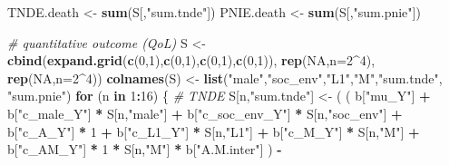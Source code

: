 \documentclass[
]{book}
\newenvironment{Shaded}{\begin{snugshade}}{\end{snugshade}}
\newcommand{\AttributeTok}[1]{\textcolor[rgb]{0.13,0.29,0.53}{#1}}
\newcommand{\CommentTok}[1]{\textcolor[rgb]{0.56,0.35,0.01}{\textit{#1}}}
\newcommand{\ConstantTok}[1]{\textcolor[rgb]{0.56,0.35,0.01}{#1}}
\newcommand{\ControlFlowTok}[1]{\textcolor[rgb]{0.13,0.29,0.53}{\textbf{#1}}}
\newcommand{\DecValTok}[1]{\textcolor[rgb]{0.00,0.00,0.81}{#1}}
\newcommand{\FunctionTok}[1]{\textcolor[rgb]{0.13,0.29,0.53}{\textbf{#1}}}
\newcommand{\NormalTok}[1]{#1}
\newcommand{\OtherTok}[1]{\textcolor[rgb]{0.56,0.35,0.01}{#1}}
\newcommand{\SpecialCharTok}[1]{\textcolor[rgb]{0.81,0.36,0.00}{\textbf{#1}}}
\newcommand{\StringTok}[1]{\textcolor[rgb]{0.31,0.60,0.02}{#1}}
\begin{document}
\begin{Shaded}
\begin{Highlighting}[]
\NormalTok{  TNDE.death }\OtherTok{\textless{}{-}} \FunctionTok{sum}\NormalTok{(S[,}\StringTok{"sum.tnde"}\NormalTok{])}
\NormalTok{  PNIE.death }\OtherTok{\textless{}{-}} \FunctionTok{sum}\NormalTok{(S[,}\StringTok{"sum.pnie"}\NormalTok{])}
  
  \CommentTok{\# quantitative outcome (QoL)}
\NormalTok{  S }\OtherTok{\textless{}{-}} \FunctionTok{cbind}\NormalTok{(}\FunctionTok{expand.grid}\NormalTok{(}\FunctionTok{c}\NormalTok{(}\DecValTok{0}\NormalTok{,}\DecValTok{1}\NormalTok{),}\FunctionTok{c}\NormalTok{(}\DecValTok{0}\NormalTok{,}\DecValTok{1}\NormalTok{),}\FunctionTok{c}\NormalTok{(}\DecValTok{0}\NormalTok{,}\DecValTok{1}\NormalTok{),}\FunctionTok{c}\NormalTok{(}\DecValTok{0}\NormalTok{,}\DecValTok{1}\NormalTok{)), }\FunctionTok{rep}\NormalTok{(}\ConstantTok{NA}\NormalTok{,}\AttributeTok{n=}\DecValTok{2}\SpecialCharTok{\^{}}\DecValTok{4}\NormalTok{), }\FunctionTok{rep}\NormalTok{(}\ConstantTok{NA}\NormalTok{,}\AttributeTok{n=}\DecValTok{2}\SpecialCharTok{\^{}}\DecValTok{4}\NormalTok{))}
  \FunctionTok{colnames}\NormalTok{(S) }\OtherTok{\textless{}{-}} \FunctionTok{list}\NormalTok{(}\StringTok{"male"}\NormalTok{,}\StringTok{"soc\_env"}\NormalTok{,}\StringTok{"L1"}\NormalTok{,}\StringTok{"M"}\NormalTok{,}\StringTok{"sum.tnde"}\NormalTok{, }\StringTok{"sum.pnie"}\NormalTok{)}
  \ControlFlowTok{for}\NormalTok{ (n }\ControlFlowTok{in} \DecValTok{1}\SpecialCharTok{:}\DecValTok{16}\NormalTok{) \{}
    \CommentTok{\# TNDE }
\NormalTok{    S[n,}\StringTok{"sum.tnde"}\NormalTok{] }\OtherTok{\textless{}{-}}\NormalTok{ ( ( b[}\StringTok{"mu\_Y"}\NormalTok{] }\SpecialCharTok{+} 
\NormalTok{                             b[}\StringTok{"c\_male\_Y"}\NormalTok{] }\SpecialCharTok{*}\NormalTok{ S[n,}\StringTok{"male"}\NormalTok{] }\SpecialCharTok{+} 
\NormalTok{                             b[}\StringTok{"c\_soc\_env\_Y"}\NormalTok{] }\SpecialCharTok{*}\NormalTok{ S[n,}\StringTok{"soc\_env"}\NormalTok{] }\SpecialCharTok{+} 
\NormalTok{                             b[}\StringTok{"c\_A\_Y"}\NormalTok{] }\SpecialCharTok{*} \DecValTok{1} \SpecialCharTok{+} 
\NormalTok{                             b[}\StringTok{"c\_L1\_Y"}\NormalTok{] }\SpecialCharTok{*}\NormalTok{ S[n,}\StringTok{"L1"}\NormalTok{] }\SpecialCharTok{+}
\NormalTok{                             b[}\StringTok{"c\_M\_Y"}\NormalTok{] }\SpecialCharTok{*}\NormalTok{ S[n,}\StringTok{"M"}\NormalTok{] }\SpecialCharTok{+}
\NormalTok{                             b[}\StringTok{"c\_AM\_Y"}\NormalTok{] }\SpecialCharTok{*} \DecValTok{1} \SpecialCharTok{*}\NormalTok{ S[n,}\StringTok{"M"}\NormalTok{] }\SpecialCharTok{*}\NormalTok{ b[}\StringTok{"A.M.inter"}\NormalTok{] ) }\SpecialCharTok{{-}} 

\end{Highlighting}
\end{Shaded}
\end{document}

